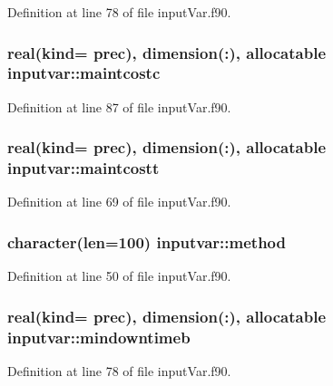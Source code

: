 Definition at line 78 of file input\-Var.\-f90.

\hypertarget{classinputvar_a4371de15edf20ae9883b07b3b843655d}{
\subsubsection[{maintcostc}]{\setlength{\rightskip}{0pt plus 5cm}real(kind= prec), dimension(\-:), allocatable inputvar\-::maintcostc}}\label{classinputvar_a4371de15edf20ae9883b07b3b843655d}


Definition at line 87 of file input\-Var.\-f90.

\hypertarget{classinputvar_abeac95d7e558ca06d4456187b380fdbc}{
\subsubsection[{maintcostt}]{\setlength{\rightskip}{0pt plus 5cm}real(kind= prec), dimension(\-:), allocatable inputvar\-::maintcostt}}\label{classinputvar_abeac95d7e558ca06d4456187b380fdbc}


Definition at line 69 of file input\-Var.\-f90.

\hypertarget{classinputvar_ad9c1a09ed4bd46ad673997ee302451a4}{
\subsubsection[{method}]{\setlength{\rightskip}{0pt plus 5cm}character(len=100) inputvar\-::method}}\label{classinputvar_ad9c1a09ed4bd46ad673997ee302451a4}


Definition at line 50 of file input\-Var.\-f90.

\hypertarget{classinputvar_ae93da8603e9899963da53596705b1d98}{
\subsubsection[{mindowntimeb}]{\setlength{\rightskip}{0pt plus 5cm}real(kind= prec), dimension(\-:), allocatable inputvar\-::mindowntimeb}}\label{classinputvar_ae93da8603e9899963da53596705b1d98}


Definition at line 78 of file input\-Var.\-f90.

